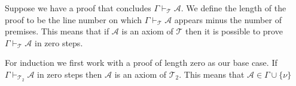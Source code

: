 \documentclass[12pt]{article}
\theoremstyle{break}
\theoremstyle{break}
\theoremstyle{break}
\theoremstyle{break}
\newcommand{\mc}[1]{\mathcal{#1}}
\begin{document}
Suppose we have a proof that concludes $\Gamma \vdash_{\mc{T}} \mc{A}$. 
We define the length of the proof to be the line number on which $\Gamma \vdash_{\mc{T}} \mc{A}$ appears minus the number of premises.
This means that if $\mc{A}$ is an axiom of $\mc{T}$ then it is possible to prove $\Gamma \vdash_{\mc{T}} \mc{A}$ in zero steps.

For induction we first work with a proof of length zero as our base case.
If $\Gamma \vdash_{\mc{T}_2} \mc{A}$ in zero steps then $\mc{A}$ is an axiom of $\mc{T}_2$.
This means that $\mc{A} \in \Gamma \cup \{\nu\}$
\end{document}
